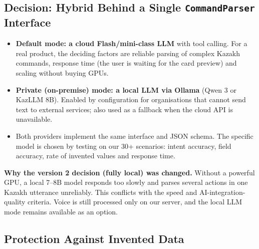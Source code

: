 \documentclass[11pt,a4paper]{article}
\newcommand{\code}[1]{\texttt{#1}}
\begin{document}
\subsection{Decision: Hybrid Behind a Single \code{CommandParser} Interface}

\begin{itemize}
  \item \textbf{Default mode: a cloud Flash/mini-class LLM} with tool calling. For a real product, the deciding factors are reliable parsing of complex Kazakh commands, response time (the user is waiting for the card preview) and scaling without buying GPUs.
  \item \textbf{Private (on-premise) mode: a local LLM via Ollama} (Qwen 3 or KazLLM 8B). Enabled by configuration for organisations that cannot send text to external services; also used as a fallback when the cloud API is unavailable.
  \item Both providers implement the same interface and JSON schema. The specific model is chosen by testing on our 30+ scenarios: intent accuracy, field accuracy, rate of invented values and response time.
\end{itemize}

\textbf{Why the version 2 decision (fully local) was changed.} Without a powerful GPU, a local 7--8B model responds too slowly and parses several actions in one Kazakh utterance unreliably. This conflicts with the speed and AI-integration-quality criteria. Voice is still processed only on our server, and the local LLM mode remains available as an option.

\subsection{Protection Against Invented Data}
\end{document}
